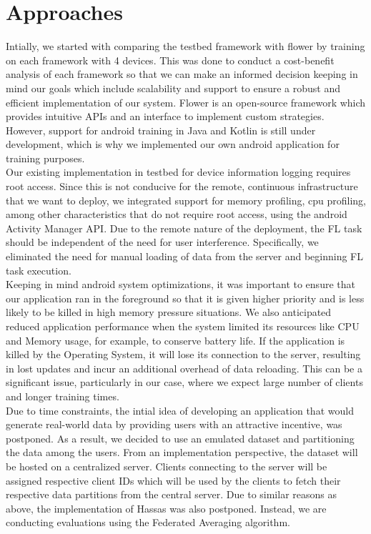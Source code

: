 \graphicspath{ {./images/} }

\section{Approaches}
    Intially, we started with comparing the testbed framework with flower by training
    on each framework with 4 devices. This was done to conduct a cost-benefit analysis
    of each framework so that we can make an informed decision keeping in mind our goals
    which include scalability and support to ensure a robust and efficient implementation of our system. Flower is an open-source framework which provides intuitive APIs and an interface to implement custom strategies. However, support for android training in Java and Kotlin is still under development, which is why we implemented our own android application for training purposes. \\
    
    Our existing implementation in testbed for device information logging requires root access. Since this is not conducive for the remote, continuous infrastructure that we want to deploy, we integrated support for memory profiling, cpu profiling, among other characteristics that do not require root access, using the android Activity Manager API.
    Due to the remote nature of the deployment, the FL task should be independent of the need for user interference. Specifically, we eliminated the need for manual loading of data from the server and beginning FL task execution. \\

    Keeping in mind android system optimizations, it was important to ensure that our application ran in the foreground so that it is given higher priority and is less likely to be killed in high memory pressure situations. We also anticipated reduced application performance when the system limited its resources like CPU and Memory usage, for example, to conserve battery life. If the application is killed by the Operating System, it will lose its connection to the server, resulting in lost updates and incur an additional overhead of data reloading. This can be a significant issue, particularly in our case, where we expect large number of clients and longer training times. \\

    Due to time constraints, the intial idea of developing an application that would generate real-world data by providing users with an attractive incentive, was postponed. As a result, we decided to use an emulated dataset and partitioning the data among the users. From an implementation perspective, the dataset will be hosted on a centralized server. Clients connecting to the server will be assigned respective client IDs which will be used by the clients to fetch their respective data partitions from the central server. Due to similar reasons as above, the implementation of Hassas was also postponed. Instead, we are conducting evaluations using the Federated Averaging algorithm. \\

    

